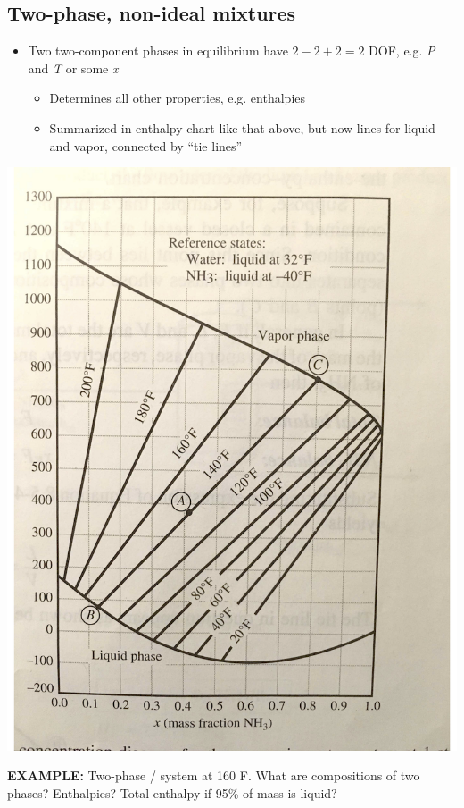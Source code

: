 \documentclass[11pt]{article}
\begin{document}
\subsection{Two-phase, non-ideal mixtures}
\label{sec-10-9}
\begin{itemize}
\item Two two-component phases in equilibrium have \(2-2+2=2\) DOF, e.g. \emph{P} and \emph{T} or some \emph{x}
\begin{itemize}
\item Determines all other properties, e.g. enthalpies
\item Summarized in enthalpy chart like that above, but now lines for liquid and vapor, connected by ``tie lines''
\end{itemize}
\end{itemize}

\includegraphics[width=.9\linewidth]{./figs/EnthalpyComposition.png}

\begin{framed}
\noindent \textbf{EXAMPLE:} Two-phase / system at 160 F. What are compositions of two phases?  Enthalpies?  Total enthalpy if 95\% of mass is liquid?
\end{framed}
\end{document}
